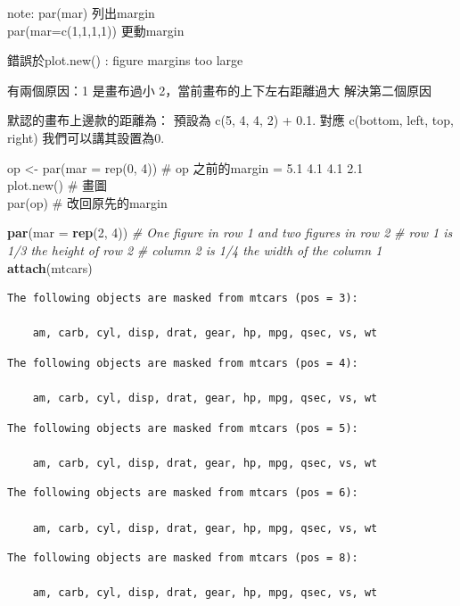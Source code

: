 \documentclass[]{book}
\newenvironment{Shaded}{\begin{snugshade}}{\end{snugshade}}
\newcommand{\CommentTok}[1]{\textcolor[rgb]{0.56,0.35,0.01}{\textit{#1}}}
\newcommand{\DataTypeTok}[1]{\textcolor[rgb]{0.13,0.29,0.53}{#1}}
\newcommand{\DecValTok}[1]{\textcolor[rgb]{0.00,0.00,0.81}{#1}}
\newcommand{\KeywordTok}[1]{\textcolor[rgb]{0.13,0.29,0.53}{\textbf{#1}}}
\newcommand{\NormalTok}[1]{#1}
\theoremstyle{definition}
\theoremstyle{definition}
\theoremstyle{definition}
\theoremstyle{remark}
\begin{document}
note: par(mar) 列出margin\\
par(mar=c(1,1,1,1)) 更動margin

錯誤於plot.new() : figure margins too large

有兩個原因：1 是畫布過小 2，當前畫布的上下左右距離過大 解決第二個原因

默認的畫布上邊款的距離為： 預設為 c(5, 4, 4, 2) + 0.1. 對應 c(bottom,
left, top, right) 我們可以講其設置為0.

op \textless{}- par(mar = rep(0, 4)) \# op 之前的margin = 5.1 4.1 4.1
2.1\\
plot.new() \# 畫圖\\
par(op) \# 改回原先的margin

\begin{Shaded}
\begin{Highlighting}[]
\KeywordTok{par}\NormalTok{(}\DataTypeTok{mar =} \KeywordTok{rep}\NormalTok{(}\DecValTok{2}\NormalTok{, }\DecValTok{4}\NormalTok{)) }
\CommentTok{# One figure in row 1 and two figures in row 2}
\CommentTok{# row 1 is 1/3 the height of row 2}
\CommentTok{# column 2 is 1/4 the width of the column 1 }
\KeywordTok{attach}\NormalTok{(mtcars)}
\end{Highlighting}
\end{Shaded}

\begin{verbatim}
The following objects are masked from mtcars (pos = 3):

    am, carb, cyl, disp, drat, gear, hp, mpg, qsec, vs, wt
\end{verbatim}

\begin{verbatim}
The following objects are masked from mtcars (pos = 4):

    am, carb, cyl, disp, drat, gear, hp, mpg, qsec, vs, wt
\end{verbatim}

\begin{verbatim}
The following objects are masked from mtcars (pos = 5):

    am, carb, cyl, disp, drat, gear, hp, mpg, qsec, vs, wt
\end{verbatim}

\begin{verbatim}
The following objects are masked from mtcars (pos = 6):

    am, carb, cyl, disp, drat, gear, hp, mpg, qsec, vs, wt
\end{verbatim}

\begin{verbatim}
The following objects are masked from mtcars (pos = 8):

    am, carb, cyl, disp, drat, gear, hp, mpg, qsec, vs, wt
\end{verbatim}
\end{document}
